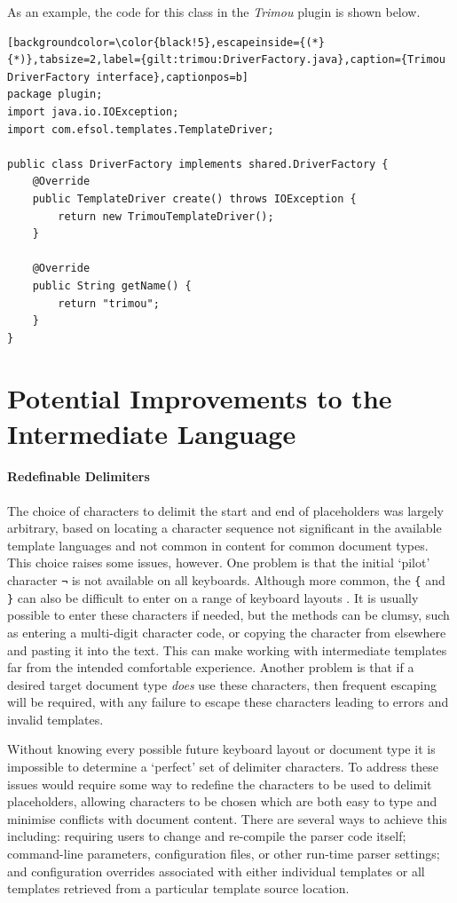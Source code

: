 As an example, the code for this class in the \emph{Trimou} plugin is shown below.

\begin{lstlisting}[backgroundcolor=\color{black!5},escapeinside={(*}{*)},tabsize=2,label={gilt:trimou:DriverFactory.java},caption={Trimou DriverFactory interface},captionpos=b]
package plugin;
import java.io.IOException;
import com.efsol.templates.TemplateDriver;

public class DriverFactory implements shared.DriverFactory {
    @Override
    public TemplateDriver create() throws IOException {
        return new TrimouTemplateDriver();
    }

    @Override
    public String getName() {
        return "trimou";
    }
}
\end{lstlisting}

\section*{Potential Improvements to the Intermediate Language}
\label{gilt:language plus}

\paragraph{Redefinable Delimiters}
The choice of characters to delimit the start and end of placeholders was largely arbitrary, based on locating a character sequence not significant in the available template languages and not common in content for common document types. This choice raises some issues, however. One problem is that the initial `pilot' character \verb!¬! is not available on all keyboards. Although more common, the \verb!{! and \verb!}! can also be difficult to enter on a range of keyboard layouts \citep{Erz2023a}. It is usually possible to enter these characters if needed, but the methods can be clumsy, such as entering a multi-digit character code, or copying the character from elsewhere and pasting it into the text. This can make working with intermediate templates far from the intended comfortable experience. Another problem is that if a desired target document type \emph{does} use these characters, then frequent escaping will be required, with any failure to escape these characters leading to errors and invalid templates.

Without knowing every possible future keyboard layout or document type it is impossible to determine a `perfect' set of delimiter characters. To address these issues would require some way to redefine the characters to be used to delimit placeholders, allowing characters to be chosen which are both easy to type and minimise conflicts with document content. There are several ways to achieve this including: requiring users to change and re-compile the parser code itself; command-line parameters, configuration files, or other run-time parser settings; and configuration overrides associated with either individual templates or all templates retrieved from a particular template source location.

